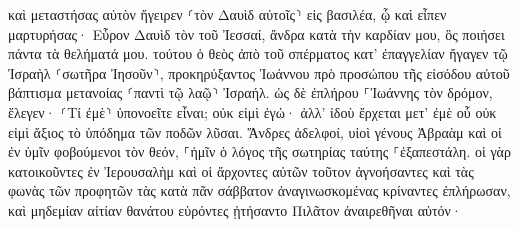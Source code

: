\documentclass{openreader}
\begin{document}
καὶ μεταστήσας αὐτὸν ἤγειρεν ⸂τὸν Δαυὶδ αὐτοῖς⸃ εἰς βασιλέα, ᾧ καὶ εἶπεν μαρτυρήσας· Εὗρον Δαυὶδ τὸν τοῦ Ἰεσσαί, ἄνδρα κατὰ τὴν καρδίαν μου, ὃς ποιήσει πάντα τὰ θελήματά μου. 
τούτου ὁ θεὸς ἀπὸ τοῦ σπέρματος κατ’ ἐπαγγελίαν ἤγαγεν τῷ Ἰσραὴλ ⸂σωτῆρα Ἰησοῦν⸃, 
προκηρύξαντος Ἰωάννου πρὸ προσώπου τῆς εἰσόδου αὐτοῦ βάπτισμα μετανοίας ⸂παντὶ τῷ λαῷ⸃ Ἰσραήλ. 
ὡς δὲ ἐπλήρου ⸀Ἰωάννης τὸν δρόμον, ἔλεγεν· ⸂Τί ἐμὲ⸃ ὑπονοεῖτε εἶναι; οὐκ εἰμὶ ἐγώ· ἀλλ’ ἰδοὺ ἔρχεται μετ’ ἐμὲ οὗ οὐκ εἰμὶ ἄξιος τὸ ὑπόδημα τῶν ποδῶν λῦσαι. 
Ἄνδρες ἀδελφοί, υἱοὶ γένους Ἀβραὰμ καὶ οἱ ἐν ὑμῖν φοβούμενοι τὸν θεόν, ⸀ἡμῖν ὁ λόγος τῆς σωτηρίας ταύτης ⸀ἐξαπεστάλη. 
οἱ γὰρ κατοικοῦντες ἐν Ἰερουσαλὴμ καὶ οἱ ἄρχοντες αὐτῶν τοῦτον ἀγνοήσαντες καὶ τὰς φωνὰς τῶν προφητῶν τὰς κατὰ πᾶν σάββατον ἀναγινωσκομένας κρίναντες ἐπλήρωσαν, 
καὶ μηδεμίαν αἰτίαν θανάτου εὑρόντες ᾐτήσαντο Πιλᾶτον ἀναιρεθῆναι αὐτόν· 
\end{document}
